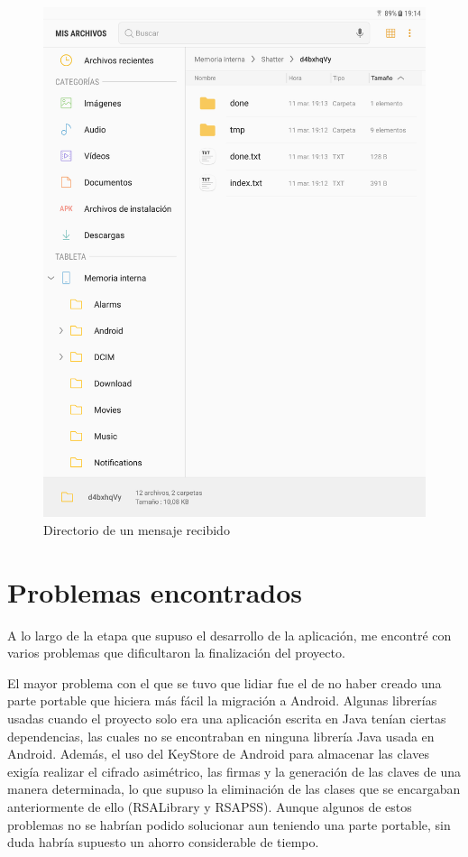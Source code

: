 \begin{figure}[ht]
  \centering
  \includegraphics[scale=0.2]{Figures/done}
  \decoRule
  \caption[Shatter (Mensaje recibido)]{Directorio de un mensaje recibido}
  \label{fig:done}
\end{figure}


\section{Problemas encontrados}

A lo largo de la etapa que supuso el desarrollo de la aplicación, me encontré
con varios problemas que dificultaron la finalización del proyecto.

El mayor problema con el que se tuvo que lidiar fue el de no haber creado una
parte portable que hiciera más fácil la migración a Android. Algunas librerías
usadas cuando el proyecto solo era una aplicación escrita en Java tenían ciertas
dependencias, las cuales no se encontraban en ninguna librería Java usada en
Android. Además, el uso del KeyStore de Android para almacenar las claves
exigía realizar el cifrado asimétrico, las firmas y la generación de las claves
de una manera determinada, lo que supuso la eliminación de las clases que se
encargaban anteriormente de ello (RSALibrary y RSAPSS). Aunque algunos de estos
problemas no se habrían podido solucionar aun teniendo una parte portable, sin
duda habría supuesto un ahorro considerable de tiempo.

